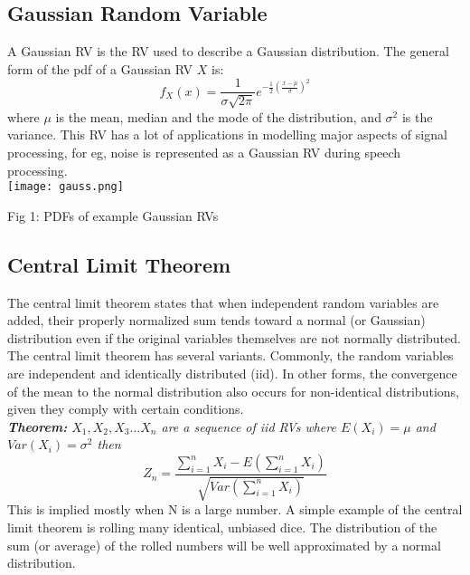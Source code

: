 \documentclass[10pt,twocolumn,letterpaper]{article}
\begin{document}


\subsection{Gaussian Random Variable}
A Gaussian RV is the RV used to describe a Gaussian distribution. The general form of the pdf of a Gaussian RV $X$ is: $$f_X(x) = \frac{1}{\sigma\sqrt{2\pi}}e^{-\frac{1}{2}(\frac{x-\mu}{\sigma})^2}$$ where $\mu$ is the mean, median and the mode of the distribution, and $\sigma^2$ is the variance. This RV has a lot of applications in modelling major aspects of signal processing, for eg, noise is represented as a Gaussian RV during speech processing.\\
\vspace{0.7cm}
\texttt{[image: gauss.png]}
\begin{center}
    Fig 1: PDFs of example Gaussian RVs
\end{center}




\subsection{Central Limit Theorem}
The central limit theorem states that when independent random variables are added, their properly normalized sum tends toward a normal (or Gaussian) distribution even if the original variables themselves are not normally distributed. The central limit theorem has several variants. Commonly, the random variables are independent and identically distributed (iid). In other forms, the convergence of the mean to the normal distribution also occurs for non-identical distributions, given they comply with certain conditions. \\
\textit{\textbf{Theorem:} $X_1,X_2,X_3 \dots X_n$ are a sequence of iid RVs where $E(X_i) = \mu$ and $Var(X_i)=\sigma ^2$ then}
$$ Z_n = \frac{\sum_{i=1}^{n}X_i - E\left(\sum_{i=1}^{n}X_i\right)}{\sqrt{Var(\sum_{i=1}^nX_i)}} $$
This is implied mostly when N is a large number. A simple example of the central limit theorem is rolling many identical, unbiased dice. The distribution of the sum (or average) of the rolled numbers will be well approximated by a normal distribution.

\end{document}
